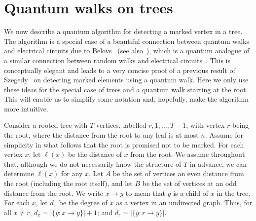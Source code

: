 \documentclass[11pt]{article}
\begin{document}

\section{Quantum walks on trees}
\label{sec:qwalk}

We now describe a quantum algorithm for detecting a marked vertex in a tree. The algorithm is a special case of a beautiful connection between quantum walks and electrical circuits due to Belovs~\cite{belovs13} (see also~\cite{belovs13a}), which is a quantum analogue of a similar connection between random walks and electrical circuits~\cite{chandra97}. This is conceptually elegant and leads to a very concise proof of a previous result of Szegedy~\cite{szegedy04} on detecting marked elements using a quantum walk. Here we only use these ideas for the special case of trees and a quantum walk starting at the root. This will enable us to simplify some notation and, hopefully, make the algorithm more intuitive.

Consider a rooted tree with $T$ vertices, labelled $r,1,\dots,T-1$, with vertex $r$ being the root, where the distance from the root to any leaf is at most $n$. Assume for simplicity in what follows that the root is promised not to be marked. For each vertex $x$, let $\ell(x)$ be the distance of $x$ from the root. We assume throughout that, although we do not necessarily know the structure of $T$ in advance, we can determine $\ell(x)$ for any $x$. Let $A$ be the set of vertices an even distance from the root (including the root itself), and let $B$ be the set of vertices at an odd distance from the root. We write $x \rightarrow y$ to mean that $y$ is a child of $x$ in the tree. For each $x$, let $d_x$ be the degree of $x$ as a vertex in an undirected graph. Thus, for all $x \neq r$, $d_x = |\{y: x \rightarrow y\}| + 1$; and $d_r = |\{y:r\rightarrow y\}|$.
\end{document}
